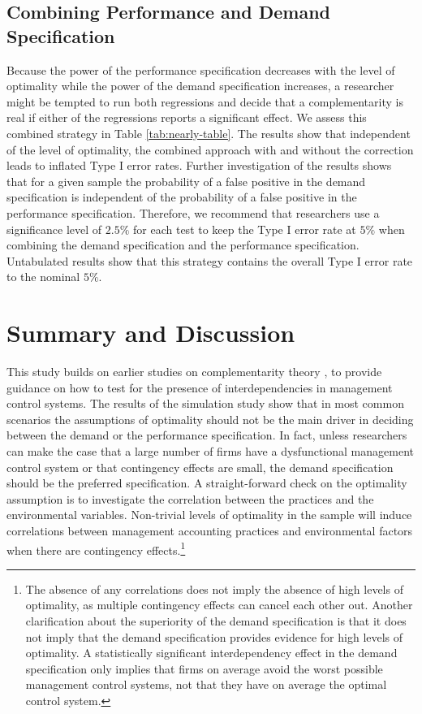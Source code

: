 \documentclass[12pt]{article}
\begin{document}
\subsection{Combining Performance and Demand Specification}

Because the power of the performance specification decreases with the level of optimality while the power of the demand specification increases, a researcher might be tempted to run both regressions and decide that a complementarity is real if either of the regressions reports a significant effect. We assess this combined strategy in Table \ref{tab:nearly-table}. The results show that independent of the level of optimality, the combined approach with and without the correction leads to inflated Type I error rates. Further investigation of the results shows that for a given sample the probability of a false positive in the demand specification is independent of the probability of a false positive in the performance specification.  Therefore, we recommend that researchers use a significance level of $2.5\%$ for each test to keep the Type I error rate at $5\%$ when combining the demand specification and the performance specification. Untabulated results show that this strategy contains the overall Type I error rate to the nominal $5\%$.

\section{Summary and Discussion}\label{summary-and-discussion}

This study builds on earlier studies on complementarity theory \citep{milgrom_complementarities_1995, grabner_management_2013}, to provide guidance on how to test for the presence of interdependencies in management control systems. The results of the simulation study show that in most common scenarios the assumptions of optimality should not be the main driver in deciding between the demand or the performance specification. In fact, unless researchers can make the case that a large number of firms have a dysfunctional management control system or that contingency effects are small, the demand specification should be the preferred specification. A straight-forward check on the optimality assumption is to investigate the correlation between the practices and the environmental variables. Non-trivial levels of optimality in the sample will induce correlations between management accounting practices and environmental factors when there are contingency effects.\footnote{The absence of any correlations does not imply the absence of high levels of optimality, as multiple contingency effects can cancel each other out. Another clarification about the superiority of the demand specification is that it does not imply that the demand specification provides evidence for high levels of optimality. A statistically significant interdependency effect in the demand specification only implies that firms on average avoid the worst possible management control systems, not that they have on average the optimal control system.}
\end{document}
